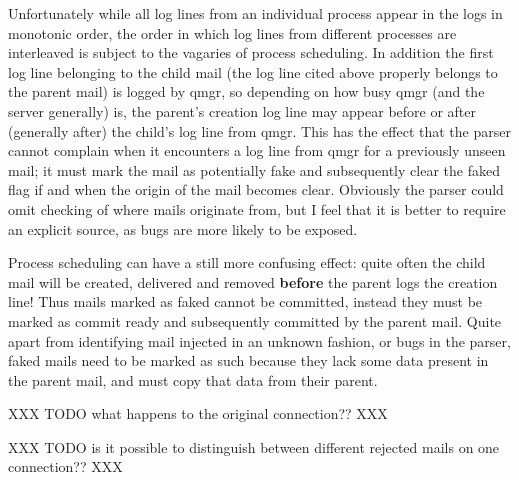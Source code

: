 \documentclass[a4paper,12pt,draft]{article}
\begin{document}
\begin{enumerate}
        Unfortunately while all log lines from an individual process appear
        in the logs in monotonic order, the order in which log lines from
        different processes are interleaved is subject to the vagaries of
        process scheduling.  In addition the first log line belonging to
        the child mail (the log line cited above properly belongs to the
        parent mail) is logged by qmgr, so depending on how busy qmgr (and
        the server generally) is, the parent's creation log line may appear
        before or after (generally after) the child's log line from qmgr.
        This has the effect that the parser cannot complain when it
        encounters a log line from qmgr for a previously unseen mail; it
        must mark the mail as potentially fake and subsequently clear the
        faked flag if and when the origin of the mail becomes clear.
        Obviously the parser could omit checking of where mails originate
        from, but I feel that it is better to require an explicit source,
        as bugs are more likely to be exposed.

        Process scheduling can have a still more confusing effect: quite
        often the child mail will be created, delivered and removed
        \textbf{before} the parent logs the creation line!  Thus mails
        marked as faked cannot be committed, instead they must be marked as
        commit ready and subsequently committed by the parent mail.  Quite
        apart from identifying mail injected in an unknown fashion, or bugs
        in the parser, faked mails need to be marked as such because they
        lack some data present in the parent mail, and must copy that data
        from their parent.


\end{enumerate}

XXX TODO what happens to the original connection?? XXX

XXX TODO is it possible to distinguish between different rejected mails on
one connection??  XXX

\appendix
\end{document}
